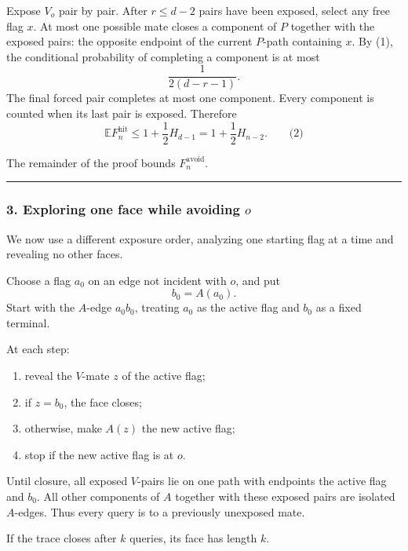 \documentclass[
  11pt,
  a4paper,
]{article}
\providecommand{\tightlist}{%
  \setlength{\itemsep}{0pt}\setlength{\parskip}{0pt}}
\begin{document}
Expose \(V_o\) pair by pair. After \(r\le d-2\) pairs have been exposed,
select any free flag \(x\). At most one possible mate closes a component
of \(P\) together with the exposed pairs: the opposite endpoint of the
current \(P\)-path containing \(x\). By (1), the conditional probability
of completing a component is at most \[
\frac{1}{2(d-r-1)}.
\] The final forced pair completes at most one component. Every
component is counted when its last pair is exposed. Therefore \[
\boxed{
\mathbb E F_n^{\mathrm{hit}}
\le
1+\frac12 H_{d-1}
=
1+\frac12 H_{n-2}.
}
\qquad\text{(2)}
\]

The remainder of the proof bounds \(F_n^{\mathrm{avoid}}\).

\begin{center}\rule{0.5\linewidth}{0.5pt}\end{center}

\subsubsection{\texorpdfstring{3. Exploring one face while avoiding
\(o\)}{3. Exploring one face while avoiding o}}\label{exploring-one-face-while-avoiding-o}

We now use a different exposure order, analyzing one starting flag at a
time and revealing no other faces.

Choose a flag \(a_0\) on an edge not incident with \(o\), and put \[
b_0=A(a_0).
\] Start with the \(A\)-edge \(a_0b_0\), treating \(a_0\) as the active
flag and \(b_0\) as a fixed terminal.

At each step:

\begin{enumerate}
\def\labelenumi{\arabic{enumi}.}
\tightlist
\item
  reveal the \(V\)-mate \(z\) of the active flag;
\item
  if \(z=b_0\), the face closes;
\item
  otherwise, make \(A(z)\) the new active flag;
\item
  stop if the new active flag is at \(o\).
\end{enumerate}

Until closure, all exposed \(V\)-pairs lie on one path with endpoints
the active flag and \(b_0\). All other components of \(A\) together with
these exposed pairs are isolated \(A\)-edges. Thus every query is to a
previously unexposed mate.

If the trace closes after \(k\) queries, its face has length \(k\).
\end{document}
